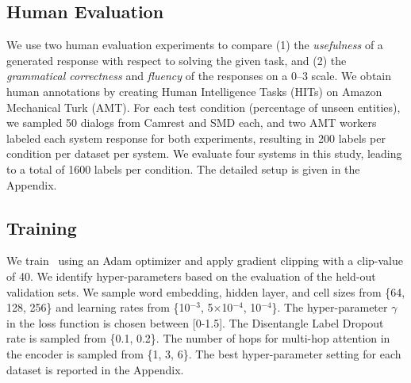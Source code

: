 \subsection{Human Evaluation}
We use two human evaluation experiments to compare (1) the \emph{usefulness} of a generated response with respect to solving the given task, and (2) the \emph{grammatical correctness} and \emph{fluency} of the responses on a 0--3 scale. We obtain human annotations by creating Human Intelligence Tasks (HITs) on Amazon Mechanical Turk (AMT). For each test condition (percentage of unseen entities), we sampled 50 dialogs from Camrest and SMD each, and two AMT workers labeled each system response for both experiments, resulting in 200 labels per condition per dataset per system. We evaluate four systems in this study, leading to a total of 1600 labels per condition. The detailed setup is given in the Appendix. 

\subsection{Training}
We train \sys\ using an Adam optimizer \cite{kingma2014adam} and apply gradient clipping with a clip-value of 40. We identify hyper-parameters based on the evaluation of the held-out validation sets. We sample word embedding, hidden layer, and cell sizes from \{64, 128, 256\} and learning rates from \{10$^{-3}$, 5$\times$10$^{-4}$, 10$^{-4}$\}. The hyper-parameter $\gamma$ in the loss function is chosen between [0-1.5]. The Disentangle Label Dropout rate is sampled from \{0.1, 0.2\}. The number of hops for multi-hop attention in the encoder is sampled from \{1, 3, 6\}. The best hyper-parameter setting for each dataset is reported in the Appendix.

